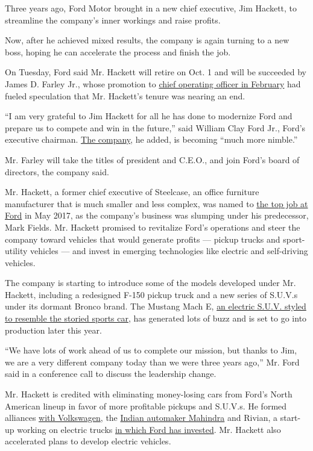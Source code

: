 Three years ago, Ford Motor brought in a new chief executive, Jim
Hackett, to streamline the company's inner workings and raise profits.

Now, after he achieved mixed results, the company is again turning to a
new boss, hoping he can accelerate the process and finish the job.

On Tuesday, Ford said Mr. Hackett will retire on Oct. 1 and will be
succeeded by James D. Farley Jr., whose promotion to
\href{https://www.nytimes3xbfgragh.onion/2020/02/07/business/ford-motor-jim-farley.html}{chief
operating officer in February} had fueled speculation that Mr. Hackett's
tenure was nearing an end.

``I am very grateful to Jim Hackett for all he has done to modernize
Ford and prepare us to compete and win in the future,'' said William
Clay Ford Jr., Ford's executive chairman.
\href{https://www.nytimes3xbfgragh.onion/topic/company/ford-motor-company}{The
company}, he added, is becoming ``much more nimble.''

Mr. Farley will take the titles of president and C.E.O., and join Ford's
board of directors, the company said.

Mr. Hackett, a former chief executive of Steelcase, an office furniture
manufacturer that is much smaller and less complex, was named to
\href{https://www.nytimes3xbfgragh.onion/2017/05/22/business/jim-hackett-ford.html}{the
top job at Ford} in May 2017, as the company's business was slumping
under his predecessor, Mark Fields. Mr. Hackett promised to revitalize
Ford's operations and steer the company toward vehicles that would
generate profits --- pickup trucks and sport-utility vehicles --- and
invest in emerging technologies like electric and self-driving vehicles.

The company is starting to introduce some of the models developed under
Mr. Hackett, including a redesigned F-150 pickup truck and a new series
of S.U.V.s under its dormant Bronco brand. The Mustang Mach E,
\href{https://www.nytimes3xbfgragh.onion/2019/11/17/business/ford-mustang-electric-suv.html}{an
electric S.U.V. styled to resemble the storied sports car}, has
generated lots of buzz and is set to go into production later this year.

``We have lots of work ahead of us to complete our mission, but thanks
to Jim, we are a very different company today than we were three years
ago,'' Mr. Ford said in a conference call to discuss the leadership
change.

Mr. Hackett is credited with eliminating money-losing cars from Ford's
North American lineup in favor of more profitable pickups and S.U.V.s.
He formed alliances
\href{https://www.nytimes3xbfgragh.onion/2019/07/05/business/ford-vw-self-driving-electric-cars.html}{with
Volkswagen}, the
\href{https://www.nytimes3xbfgragh.onion/2019/10/01/business/ford-india.html}{Indian
automaker Mahindra} and Rivian, a start-up working on electric trucks
\href{https://www.nytimes3xbfgragh.onion/2019/04/24/business/ford-rivian-investment.html}{in
which Ford has invested}. Mr. Hackett also accelerated plans to develop
electric vehicles.

